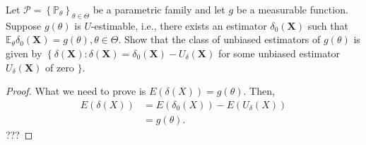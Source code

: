\begin{ex}
    Let \(\mathcal{P}=\left\{\mathbb{P}_{\theta}\right\}_{\theta \in \Theta}\) be a parametric family and let \(g\) be a measurable function. Suppose \(g(\theta)\) is \(U\)-estimable, i.e., there exists an estimator \(\delta_{0}(\mathbf{X})\) such that \(\mathbb{E}_{\theta} \delta_{0}(\mathbf{X})=g(\theta), \theta \in \Theta\). Show that the class of unbiased estimators of \(g(\theta)\) is given by
    \(\left\{\delta(\mathbf{X}): \delta(\mathbf{X})=\delta_{0}(\mathbf{X})-U_{\delta}(\mathbf{X})\right.\) for some unbiased estimator \(U_{\delta}(\mathbf{X})\) of zero \(\}\).
\end{ex}

\begin{proof}
    What we need to prove is $E(\delta(X))=g(\theta)$. Then, 
    \[
        \begin{aligned}
            E(\delta(X))&=E(\delta_0(X))-E(U_\delta(X))\\
            &=g(\theta). 
        \end{aligned}
    \]
    ???
\end{proof}

